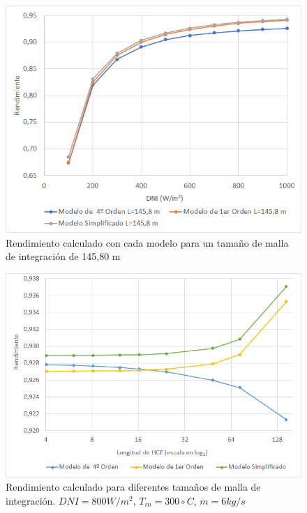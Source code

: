 \begin{figure}[h!]
\includegraphics[width=0.9\linewidth]{images/malla14580.png}
\caption{Rendimiento calculado con cada modelo para un tamaño de malla de integración de 145,80 m} 
\label{fig:malla14580}
\end{figure}


\begin{figure}[h!]
\includegraphics[width=0.9\linewidth]{images/malla_variable_DNI_800.png}
\caption{Rendimiento calculado para diferentes tamaños de malla de integración. $DNI=800 W/m^2$, $T_{in}=300 \circ C$, $\dot m = 6 kg/s$} 
\label{fig:malla_variable_DNI_800}
\end{figure}


